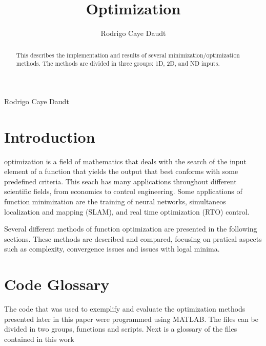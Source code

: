 \documentclass[journal]{IEEEtran}
\begin{document}
\title{Optimization}

\author{Rodrigo Caye Daudt}

%
{Rodrigo Caye Daudt}


\maketitle


\begin{abstract}
This describes the implementation and results of several minimization/optimization methods. The methods are divided in three groups: 1D, 2D, and ND inputs.
\end{abstract}




\IEEEpeerreviewmaketitle


\section{Introduction}

 optimization is a field of mathematics that deals with the search of the input element of a function that yields the output that best conforms with some predefined criteria. This seach has many applications throughout different scientific fields, from economics to control engineering. Some applications of function minimization are the training of neural networks, simultaneos localization and mapping (SLAM), and real time optimization (RTO) control.

Several different methods of function optimization are presented in the following sections. These methods are described and compared, focusing on pratical aspects such as complexity, convergence issues and issues with logal minima.




\section{Code Glossary}

The code that was used to exemplify and evaluate the optimization methods presented later in this paper were programmed using MATLAB. The files can be divided in two groups, functions and scripts. Next is a glossary of the files contained in this work
\end{document}
